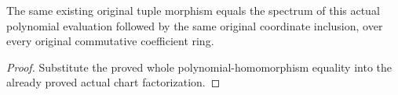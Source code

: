 \begin{theorem}
\label{thm:general-generated-tuple-original-map-evaluation}
\leanok
The same existing original tuple morphism equals the spectrum of this
actual polynomial evaluation followed by the same original coordinate
inclusion, over every original commutative coefficient ring.
\end{theorem}
\begin{proof}
Substitute the proved whole polynomial-homomorphism equality into the
already proved actual chart factorization.
\end{proof}
